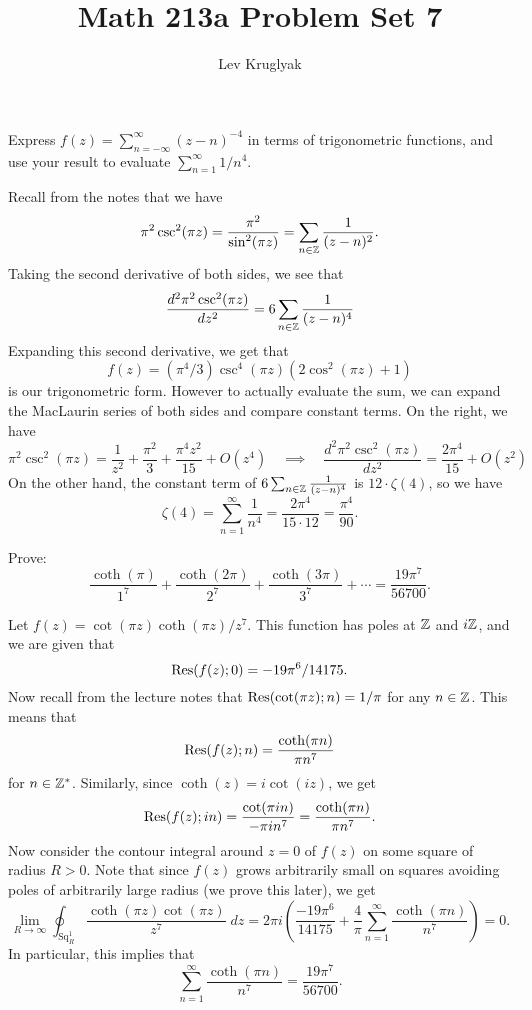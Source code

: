 \documentclass{pset}
\title{Math 213a Problem Set 7}
\author{Lev Kruglyak}
\begin{document}
\maketitle
\collaborators

\begin{problem}{3.15}
  Express $f(z) = \sum^\infty_{n=-\infty}(z-n)^{-4}$ in terms of trigonometric functions, and use your result to evaluate $\sum^\infty_{n=1} 1/n^4$.
\end{problem}

\begin{solution}
  Recall from the notes that we have 
  \[
    \pi^2\csc^2(\pi z)=\frac{\pi^2}{\sin^2(\pi z)} = \sum_{n\in \mathbb{Z}}\frac{1}{(z-n)^2}.
  \]
  Taking the second derivative of both sides, we see that
  \[\frac{d^2\pi^2\csc^2(\pi z)}{dz^2} = 6\sum_{n\in \mathbb{Z}} \frac{1}{(z-n)^4} \]
  Expanding this second derivative, we get that \[f(z) = (\pi^4/3)\csc^4(\pi z)\left(2\cos^2(\pi z) + 1\right)\] is our trigonometric form. However to actually evaluate the sum, we can expand the MacLaurin series of both sides and compare constant terms. On the right, we have
  \[
    \pi^2\csc^2(\pi z) = \frac{1}{z^2}+\frac{\pi^2}{3}+\frac{\pi^4z^2}{15}+O(z^4) \quad\implies\quad \frac{d^2\pi^2\csc^2(\pi z)}{dz^2} = \frac{2\pi^4}{15}+O(z^2)
  \]
  On the other hand, the constant term of $6\sum_{n\in \mathbb{Z}} \frac{1}{(z-n)^4}$ is $12\cdot\zeta(4)$, so we have
  \[
    \zeta(4) = \sum^\infty_{n=1} \frac{1}{n^4}=\frac{2\pi^4}{15\cdot 12} = \frac{\pi^4}{90}.
  \]
\end{solution}

\begin{problem}{3.17}
  Prove:
  \[
    \frac{\coth(\pi)}{1^7} + \frac{\coth(2\pi)}{2^7}+\frac{\coth(3\pi)}{3^7}+\cdots = \frac{19\pi^7}{56700}.
  \]
\end{problem}

Let $f(z)=\cot(\pi z)\coth(\pi z)/z^7$. This function has poles at $\mathbb{Z}$ and $i\mathbb{Z}$, and we are given that \[\textrm{Res}(f(z); 0) = -19\pi^6/14175.\]
Now recall from the lecture notes that $\textrm{Res}(\cot(\pi z); n) = 1/\pi$ for any $n\in \mathbb{Z}$. This means that
\[
    \textrm{Res}(f(z); n) = \frac{\coth(\pi n)}{\pi n^7}
\]
for $n\in \mathbb{Z}^*$. Similarly, since $\coth(z)=i\cot(iz)$, we get
\[
  \textrm{Res}(f(z); in) = \frac{\cot(\pi in)}{-\pi in^7} = \frac{\coth(\pi n)}{\pi n^7}.
\]
Now consider the contour integral around $z=0$ of $f(z)$ on some square of radius $R>0$. Note that since $f(z)$ grows arbitrarily small on squares avoiding poles of arbitrarily large radius (we prove this later), we get
\[
  \lim_{R\to \infty}\oint_{\textrm{Sq}^1_R} \frac{\coth(\pi z)\cot(\pi z)}{z^7}\;dz = 2\pi i\left(\frac{-19\pi^6}{14175} + \frac{4}{\pi}\sum^\infty_{n=1}\frac{\coth(\pi n)}{n^7}\right) = 0.
\]
In particular, this implies that
\[
    \sum^\infty_{n=1}\frac{\coth(\pi n)}{n^7} = \frac{19\pi^7}{56700}.
\]
\end{document}

